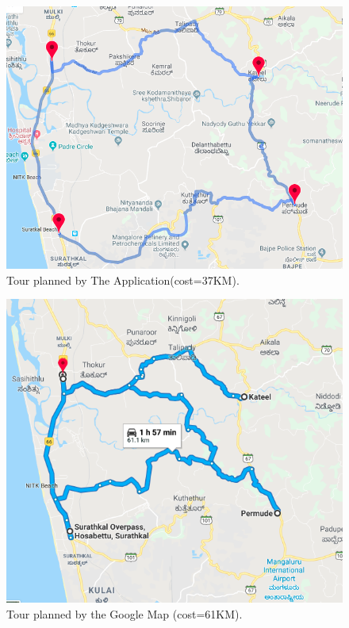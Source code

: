 \documentclass[conference]{IEEEtran}
\begin{document}
\begin{figure}[htbp]
\centerline{\includegraphics[width=\columnwidth]{tspResultApp.png}}
\caption{Tour planned by The Application(cost=37KM).}
\label{fig3}
\end{figure}


\begin{figure}[htbp]
\centerline{\includegraphics[width=\columnwidth]{tspResultGoogle.png}}
\caption{Tour planned by the Google Map (cost=61KM).}
\label{fig4}
\end{figure}
\end{document}
